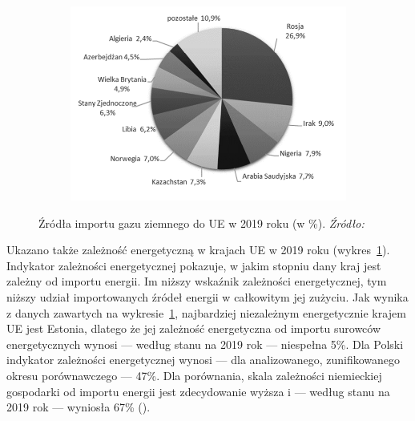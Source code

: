\documentclass[polish, twoside, 12pt, a4paper]{article}
\theoremstyle{definition}
\theoremstyle{plain}
\theoremstyle{remark}
\begin{document}
\begin{figure}[hbt]
  \centering

  \begin{subfigure}[t]{0.45\textwidth}
    \hspace{-1cm}
    \includegraphics[width=1.3\textwidth]{./out_figures/figure_3}
  \end{subfigure}

  \captionsetup{margin=10pt,font=small,labelfont=bf,width=.8\textwidth}

  \caption[Źródła importu gazu ziemnego do UE w 2019 roku (w \%).]{Źródła importu gazu ziemnego do UE w 2019 roku (w \%). \textit{Źródło:} \cite{pangsykania2022}}\label{fig:x3}
\end{figure}

Ukazano także zależność energetyczną w krajach UE w 2019 roku (wykres~\ref{fig:x3}). Indykator zależności energetycznej pokazuje, w jakim stopniu dany kraj jest zależny od importu energii. Im niższy wskaźnik zależności energetycznej, tym niższy udział importowanych źródeł energii w całkowitym jej zużyciu. Jak wynika z danych zawartych na wykresie~\ref{fig:x3}, najbardziej niezależnym energetycznie krajem UE jest Estonia, dlatego że jej zależność energetyczna od importu surowców energetycznych wynosi --- według stanu na 2019 rok --- niespełna 5\%. Dla Polski indykator zależności energetycznej wynosi --- dla analizowanego, zunifikowanego okresu porównawczego --- 47\%. Dla porównania, skala zależności niemieckiej gospodarki od importu energii jest zdecydowanie wyższa i --- według stanu na 2019 rok --- wyniosła 67\% (\cite{pangsykania2022}).
\end{document}
